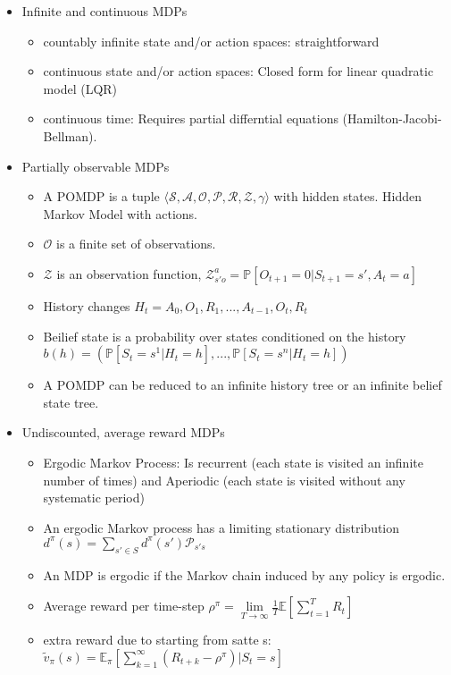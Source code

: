 \begin{itemize}[noitemsep,nolistsep]
\begin{itemize}
\begin{itemize}
		\end{itemize}
	\end{itemize}
	\item Infinite and continuous MDPs
	\begin{itemize}[noitemsep,nolistsep]
		\item countably infinite state and/or action spaces: straightforward
		\item continuous state and/or action spaces: Closed form for linear quadratic model (LQR)
		\item continuous time: Requires partial differntial equations (Hamilton-Jacobi-Bellman).
	\end{itemize}
	\item Partially observable MDPs
	\begin{itemize}[noitemsep,nolistsep]
		\item A POMDP is a tuple $\langle \mathcal{S,A,O,P,R,Z},\gamma \rangle$ with hidden states. Hidden Markov Model with actions.
		\item $\mathcal{O}$ is a finite set of observations.
		\item $\mathcal{Z}$ is an observation function, $\mathcal{Z}_{s'o}^a = \mathbb{P}[O_{t+1} = 0 | S_{t+1} = s', A_t = a]$
		\item History changes $H_t = A_0,O_1,R_1,...,A_{t-1},O_t,R_t$
		\item Beilief state is a probability over states conditioned on the history $b(h) = (\mathbb{P}[S_t = s^1 | H_t = h],...,\mathbb{P}[S_t = s^n | H_t = h])$
		\item A POMDP can be reduced to an infinite history tree or an infinite belief state tree.
	\end{itemize}
	\item Undiscounted, average reward MDPs
	\begin{itemize}[noitemsep,nolistsep]
		\item Ergodic Markov Process: Is recurrent (each state is visited an infinite number of times) and Aperiodic (each state is visited without any systematic period)
		\item An ergodic Markov process has a limiting stationary distribution $d^\pi(s) = \sum_{s' \in S}d^\pi(s')\mathcal{P}_{s's}$ 
		\item An MDP is ergodic if the Markov chain induced by any policy is ergodic.
		\item Average reward per time-step $\rho^\pi = \underset{T \rightarrow \infty}{\lim} \frac{1}{T} \mathbb{E}[\sum_{t=1}^T R_t] $
		\item extra reward due to starting from satte s: $\tilde{v}_\pi(s) = \mathbb{E}_\pi [\sum_{k=1}^\infty (R_{t+k} - \rho^\pi) | S_t = s]$
	\end{itemize}
\end{itemize} 

